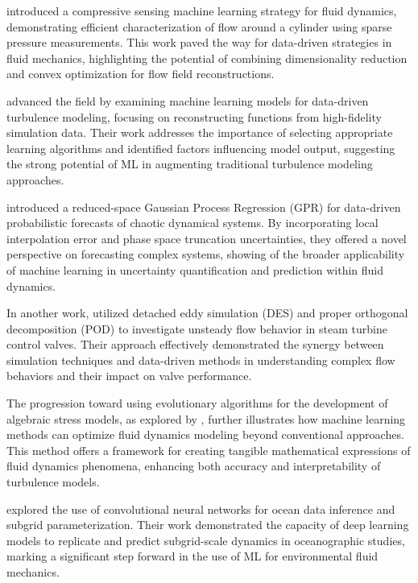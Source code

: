 \citet{Bright2013} introduced a compressive sensing machine learning strategy for fluid dynamics, demonstrating efficient characterization of flow around a cylinder using sparse pressure measurements. This work paved the way for data-driven strategies in fluid mechanics, highlighting the potential of combining dimensionality reduction and convex optimization for flow field reconstructions. 

\citet{Zhang2015} advanced the field by examining machine learning models for data-driven turbulence modeling, focusing on reconstructing functions from high-fidelity simulation data. Their work addresses the importance of selecting appropriate learning algorithms and identified factors influencing model output, suggesting the strong potential of ML in augmenting traditional turbulence modeling approaches.

\cite{Wan2017a} introduced a reduced-space Gaussian Process Regression (GPR) for data-driven probabilistic forecasts of chaotic dynamical systems. By incorporating local interpolation error and phase space truncation uncertainties, they offered a novel perspective on forecasting complex systems, showing of the broader applicability of machine learning in uncertainty quantification and prediction within fluid dynamics.

In another work, \citet{Wang2017a} utilized detached eddy simulation (DES) and proper orthogonal decomposition (POD) to investigate unsteady flow behavior in steam turbine control valves. Their approach effectively demonstrated the synergy between simulation techniques and data-driven methods in understanding complex flow behaviors and their impact on valve performance.

The progression toward using evolutionary algorithms for the development of algebraic stress models, as explored by \citet{Weatheritt2017c}, further illustrates how machine learning methods can optimize fluid dynamics modeling beyond conventional approaches. This method offers a framework for creating tangible mathematical expressions of fluid dynamics phenomena, enhancing both accuracy and interpretability of turbulence models.

\citet{Bolton2019b} explored the use of convolutional neural networks for ocean data inference and subgrid parameterization. Their work demonstrated the capacity of deep learning models to replicate and predict subgrid-scale dynamics in oceanographic studies, marking a significant step forward in the use of ML for environmental fluid mechanics.

